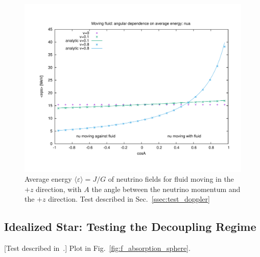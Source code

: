 \documentclass[aps,floatfix,prd,superscriptaddress,twocolumn]{revtex4-1}
\begin{document}
\begin{figure}
  \includegraphics[width=\columnwidth]{fig-moving_fluid-avg_eps_vs_cosA}
  \caption{Average energy $\langle\varepsilon\rangle=J/G$
    of neutrino fields for fluid moving in the $+z$ direction,
    with $A$ the angle between the neutrino momentum and the $+z$ direction.
    Test described in Sec.~\ref{ssec:test_doppler}}
  \label{fig:avg_eps_doppler}
\end{figure}

\subsection{Idealized Star:
  Testing the Decoupling Regime}
\label{ssec:test_ab_star}
[Test described in~\cite[Sec.~3.2]{smit1997-two_moment}.]
Plot in Fig.~\ref{fig:f_absorption_sphere}.
\end{document}
